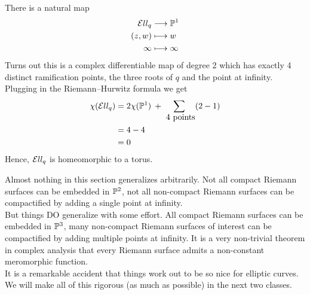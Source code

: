 \documentclass{article}
\begin{document}
  There is a natural map
  \begin{align*}
    \mathcal{E} ll_q &\longrightarrow \mathbb{P}^1 \\
    (z,w) &\longmapsto w \\
    \infty &\longmapsto \infty
  \end{align*}
  Turns out this is a complex differentiable map of degree 2 which has exactly 4 distinct ramification points, the three roots of $q$ and the point at infinity.
  Plugging in the Riemann--Hurwitz formula we get
  \begin{align*}
    \chi(\mathcal{E} ll_q)
    &= 2 \chi(\mathbb{P}^1) \: + \sum_{\mbox{ 4 points}} (2 - 1) \\
    &= 4 - 4 \\
    &= 0
  \end{align*}
  Hence, $\mathcal{E} ll_q$ is homeomorphic to a torus.

  \begin{mdframed}
    Almost nothing in this section generalizes arbitrarily.
    Not all compact Riemann surfaces can be embedded in $\mathbb{P}^2$, not all non-compact Riemann surfaces can be compactified by adding a single point at infinity.\\

    But things DO generalize with some effort. All compact Riemann surfaces can be embedded in $\mathbb{P}^3$, many non-compact Riemann surfaces of interest can be compactified by adding multiple points at infinity.
    It is a very non-trivial theorem in complex analysis that every Riemann surface admits a non-constant meromorphic function.\\

    It is a remarkable accident that things work out to be so nice for elliptic curves.\\

    We will make all of this rigorous (as much as possible) in the next two classes.
  \end{mdframed}
\end{document}
